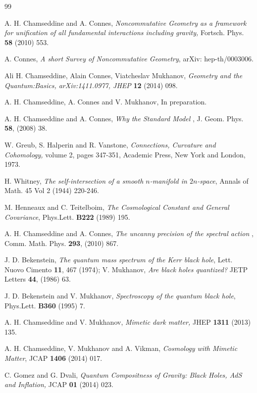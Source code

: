 \documentclass
[twocolumn,prl,unsortedaddress,superscriptaddress,showpacs]{revtex4}%
\begin{document}
\begin{thebibliography}{99}                                                                                               %


A. H. Chamseddine and A. Connes, \textit{Noncommutative Geometry
as a framework for unification of all fundamental interactions including
gravity, }Fortsch. Phys. \textbf{58 }(2010) 553.

A. Connes, \textit{A short Survey of Noncommutative
Geometry}, arXiv: hep-th/0003006.

Ali H. Chamseddine, Alain Connes, Viatcheslav Mukhanov,
\textit{Geometry and the Quantum:Basics, arXiv:1411.0977, JHEP }\textbf{12
}(2014) 098.

A. H. Chamseddine, A. Connes and V. Mukhanov, In preparation.

A. H. Chamseddine and A. Connes, \textit{Why the Standard Model}
, J. Geom. Phys. \textbf{58}, (2008) 38.

W. Greub, S. Halperin and R. Vanstone, \textit{Connections,
Curvature and Cohomology, }volume 2, pages 347-351, Academic Press, New York
and London, 1973.

H. Whitney, \textit{The self-intersection of a smooth
$n$-manifold in $2n$-space}, Annals of Math. 45 Vol 2 (1944) 220-246.

M. Henneaux and C. Teitelboim, \textit{The Cosmological Constant
and General Covariance}, Phys.Lett. \textbf{B222} (1989) 195.

A. H. Chamseddine and A. Connes, \textit{The uncanny precision of
the spectral action} , Comm. Math. Phys. \textbf{293}, (2010) 867.

J. D. Bekenstein, \textit{The quantum mass spectrum of the Kerr
black hole}, Lett. Nuovo Cimento \textbf{11}, 467 (1974); V. Mukhanov,
\textit{Are black holes quantized?} JETP Letters \textbf{44}, (1986) 63.

J. D. Bekenstein and V. Mukhanov, \textit{Spectroscopy of the
quantum black hole}, Phys.Lett. \textbf{B360} (1995) 7.

A. H. Chamseddine and V. Mukhanov, \textit{Mimetic dark matter,
}JHEP \textbf{1311} (2013) 135.

A. H. Chamseddine, V. Mukhanov and A. Vikman, \textit{Cosmology
with Mimetic Matter}, JCAP \textbf{1406} (2014) 017.

C. Gomez and G. Dvali, \textit{Quantum Compositness of
Gravity: Black Holes, AdS and Inflation, }JCAP \textbf{01 }(2014) 023.
\end{thebibliography}
\end{document}
